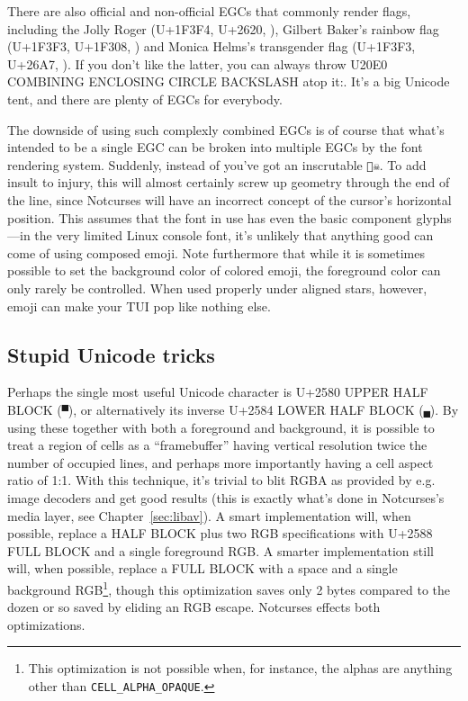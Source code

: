 There are also official and non-official EGCs that commonly render flags, including
the Jolly Roger (U+1F3F4, U+2620, ),
Gilbert Baker's rainbow flag (U+1F3F3, U+1F308, ) and Monica Helms's
transgender flag (U+1F3F3, U+26A7, ).
If you don't like the latter, you can always throw U20E0 COMBINING ENCLOSING
CIRCLE BACKSLASH atop it:. It's a big Unicode tent, and there are plenty
of EGCs for everybody.

The downside of using such complexly combined EGCs is of course that what's
intended to be a single EGC can be broken into multiple EGCs by the font
rendering system. Suddenly, instead of 
you've got an inscrutable \texttt{🏴☠}. To add insult to injury, this will
almost certainly screw up geometry through the end of the line, since Notcurses
will have an incorrect concept of the cursor's horizontal position. This
assumes that the font in use has even the basic component glyphs---in the very
limited Linux console font, it's unlikely that anything good can come of using
composed emoji. Note furthermore that while it is sometimes possible to set the
background color of colored emoji, the foreground color can only rarely be
controlled. When used properly under aligned stars, however, emoji can make
your TUI pop like nothing else.

\subsection{Stupid Unicode tricks}
Perhaps the single most useful Unicode character is U+2580 UPPER HALF BLOCK
(\texttt{▀}), or alternatively its inverse U+2584 LOWER HALF BLOCK
(\texttt{▄}). By using these together with both a foreground and background,
it is possible to treat a region of cells as a ``framebuffer'' having
vertical resolution twice the number of occupied lines, and perhaps more importantly
having a cell aspect ratio of 1:1. With this technique, it's trivial to blit
RGBA as provided by e.g. image decoders and get good results (this is exactly
what's done in Notcurses's media layer, see Chapter~\ref{sec:libav}). A smart
implementation will, when possible, replace a HALF BLOCK plus two RGB specifications
with U+2588 FULL BLOCK and a single foreground RGB. A smarter implementation
still will, when possible, replace a FULL BLOCK with a space and a single
background RGB\footnote{This optimization is not possible when, for instance,
the alphas are anything other than \texttt{CELL\_ALPHA\_OPAQUE}.}, though this
optimization saves only 2 bytes compared to the dozen or so saved by eliding
an RGB escape. Notcurses effects both optimizations.


